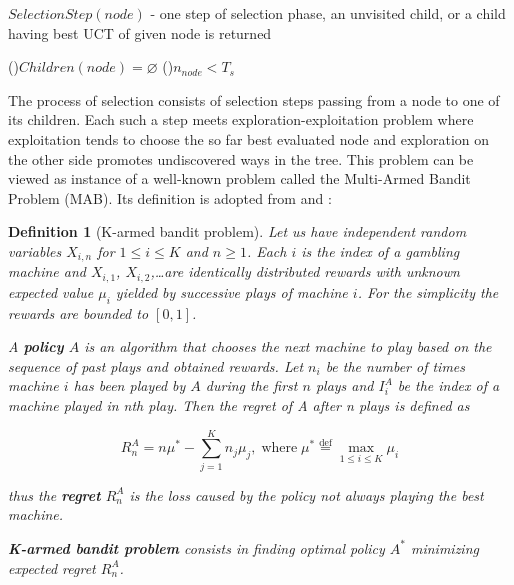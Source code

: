 \begin{algorithm}
\DontPrintSemicolon
\caption{$SelectionStep(node)$ - one step of selection phase, an unvisited child, or a child 
having best UCT of given node is returned
\label{alg_selection_step}}
\If(){$Children(node)=\varnothing$}{
}
\If(){$n_{node} < T_s$}{
     
}
 
\end{algorithm}

The process of selection consists of selection steps passing from a node to one of its children.
Each such a step meets exploration-exploitation problem where exploitation tends to choose the
so far best evaluated node and exploration on the other side promotes
undiscovered ways in the tree. This problem can be viewed as instance of a well-known problem 
called the Multi-Armed Bandit Problem (MAB). Its definition is adopted from \cite{Auer2002} and 
\cite{Kocsis2006}:

\newtheorem*{defmab}{Definition}
\begin{defmab}[K-armed bandit problem] 

Let us have independent random variables $X_{i,n}$ for $1 \le i \le K$ and $n \ge 1$. Each $i$ is
the index of a gambling machine and $X_{i,1}$, $X_{i,2}$,\ldots are identically distributed rewards
with unknown expected value $\mu_i$ yielded by successive plays of machine $i$. For the simplicity
the rewards are bounded to $[0,1]$.

A \textbf{policy} $A$ is an algorithm that chooses the next machine to play based on the sequence of
past plays and obtained rewards. Let $n_i$ be the number of times machine $i$ has been played by
$A$ during the first $n$ plays and $I_i^A$ be the index of a machine played in nth play. Then the
regret of A after n plays is defined as

\begin{equation}
R_n^A = n \mu^* - \sum_{j=1}^K n_j \mu_j \mathrm{,\;where}\;\mu^* \stackrel{\mathrm{def}}{=}
\max_{1 \le i \le K} \mu_i
\end{equation}

thus the \textbf{regret} $R_n^A$ is the loss caused by the policy not always playing the best machine.

\textbf{K-armed bandit problem} consists in finding optimal policy $A^*$ minimizing
expected regret $R_n^A$.

\end{defmab}


